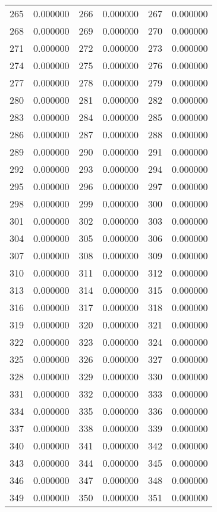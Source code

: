 \documentclass[12pt]{article}
\begin{document}
\begin{longtable}{@{}cc|cc|cc@{}}
265 & 0.000000 & 266 & 0.000000 & 267 & 0.000000 \\
268 & 0.000000 & 269 & 0.000000 & 270 & 0.000000 \\
271 & 0.000000 & 272 & 0.000000 & 273 & 0.000000 \\
274 & 0.000000 & 275 & 0.000000 & 276 & 0.000000 \\
277 & 0.000000 & 278 & 0.000000 & 279 & 0.000000 \\
280 & 0.000000 & 281 & 0.000000 & 282 & 0.000000 \\
283 & 0.000000 & 284 & 0.000000 & 285 & 0.000000 \\
286 & 0.000000 & 287 & 0.000000 & 288 & 0.000000 \\
289 & 0.000000 & 290 & 0.000000 & 291 & 0.000000 \\
292 & 0.000000 & 293 & 0.000000 & 294 & 0.000000 \\
295 & 0.000000 & 296 & 0.000000 & 297 & 0.000000 \\
298 & 0.000000 & 299 & 0.000000 & 300 & 0.000000 \\
301 & 0.000000 & 302 & 0.000000 & 303 & 0.000000 \\
304 & 0.000000 & 305 & 0.000000 & 306 & 0.000000 \\
307 & 0.000000 & 308 & 0.000000 & 309 & 0.000000 \\
310 & 0.000000 & 311 & 0.000000 & 312 & 0.000000 \\
313 & 0.000000 & 314 & 0.000000 & 315 & 0.000000 \\
316 & 0.000000 & 317 & 0.000000 & 318 & 0.000000 \\
319 & 0.000000 & 320 & 0.000000 & 321 & 0.000000 \\
322 & 0.000000 & 323 & 0.000000 & 324 & 0.000000 \\
325 & 0.000000 & 326 & 0.000000 & 327 & 0.000000 \\
328 & 0.000000 & 329 & 0.000000 & 330 & 0.000000 \\
331 & 0.000000 & 332 & 0.000000 & 333 & 0.000000 \\
334 & 0.000000 & 335 & 0.000000 & 336 & 0.000000 \\
337 & 0.000000 & 338 & 0.000000 & 339 & 0.000000 \\
340 & 0.000000 & 341 & 0.000000 & 342 & 0.000000 \\
343 & 0.000000 & 344 & 0.000000 & 345 & 0.000000 \\
346 & 0.000000 & 347 & 0.000000 & 348 & 0.000000 \\
349 & 0.000000 & 350 & 0.000000 & 351 & 0.000000 \\

\end{longtable}
\end{document}
